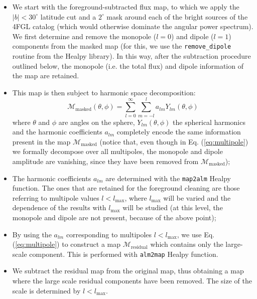 \begin{itemize}
\item We start with the foreground-subtracted flux map, to which we apply the $|b|<30^\circ$ latitude cut and a $2^\circ$ mask around each of the bright sources of the 4FGL catalog (which would otherwise dominate the angular power spectrum).
We first determine and remove the monopole ($l=0$) and dipole ($l=1$) components from the masked map (for this, we use the \verb|remove_dipole| routine from the Healpy library). In this way, after the subtraction procedure outlined below, the monopole (i.e. the total flux) and dipole information of the \fermi map are retained.

\item  This map is then subject to harmonic space decomposition:
\begin{equation}
\mathcal{M}_\textrm{masked}(\theta,\phi) = \sum_{l=0}^{\infty} \sum_{m=-l}^{l} a_{lm} Y_{lm}(\theta,\phi)
\label{eq:multipole}
\end{equation}
where $\theta$ and $\phi$ are angles on the sphere, $Y_{lm}(\theta,\phi)$ the spherical harmonics and the harmonic coefficients $a_{lm}$ completely encode the same information present in the map $\mathcal{M}_\textrm{masked}$  (notice that, even though in Eq. (\ref{eq:multipole}) we formally decompose over all multipoles, the monopole and dipole amplitude are vanishing, since they have been removed from  $\mathcal{M}_\textrm{masked}$);

\item The harmonic coefficients $a_{lm}$ are determined with the \verb|map2alm| Healpy function. The ones that are retained for the foreground cleaning are those referring to multipole values $l < l_\textrm{max}$, where $l_\textrm{max}$ will be varied and the dependence of the results with $l_\textrm{max}$ will be studied (at this level, the monopole and dipole are not present, because of the above point);

\item By using the $a_{lm}$ corresponding to multipoles $l < l_\textrm{max}$, we use Eq. (\ref{eq:multipole}) to construct a map $\mathcal{M}_\textrm{residual}$ which contains only the large-scale component. This is performed with \verb|alm2map| Healpy function.

\item We subtract the residual map from the original map, thus obtaining a map where the large scale residual components have been removed. The size of the scale is determined by $l < l_\textrm{max}$.

\end{itemize}

